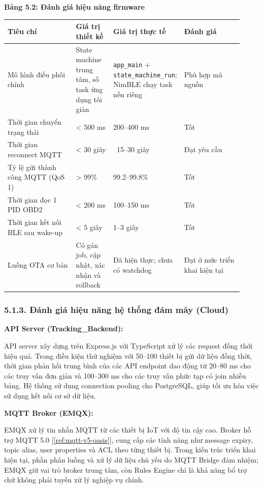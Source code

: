 \documentclass[13pt,a4paper]{extarticle}
\newcounter{none} %
\newcommand{\thesislongtableorignewline}{}
\let\thesislongtableorignewline\\
\renewcommand{\\}{\thesislongtableorignewline\hline}%
\let\\\thesislongtableorignewline
\newcommand{\thesistabletitle}[1]{%
  \begin{center}\textbf{#1}\end{center}%
}
\newcommand{\ieeecite}[1]{[\ref{#1}]}
\providecommand{\parencite}[1]{\ieeecite{#1}}
\begin{document}
\thesistabletitle{Bảng 5.2: Đánh giá hiệu năng firmware}

{\def\LTcaptype{none} %
\begin{longtable}{|p{0.30\linewidth}|p{0.16\linewidth}|p{0.20\linewidth}|p{0.26\linewidth}|}
\hline \textbf{Tiêu chí} & \textbf{Giá trị thiết kế} & \textbf{Giá trị thực tế} & \textbf{Đánh giá} \\
\hline
\endhead
\hline
\endlastfoot
Mô hình điều phối chính & State machine trung tâm, số task ứng dụng tối
giản & \texttt{app\_main} + \texttt{state\_machine\_run}; NimBLE chạy
task nền riêng & Phù hợp mã nguồn \\
Thời gian chuyển trạng thái & \textless{} 500 ms & 200--400 ms & Tốt \\
Thời gian reconnect MQTT & \textless{} 30 giây & ~15--30
giây & Đạt yêu cầu \\
Tỷ lệ gửi thành công MQTT (QoS 1) & \textgreater{} 99\% & 99.2--99.8\% &
Tốt \\
Thời gian đọc 1 PID OBD2 & \textless{} 200 ms & 100--150 ms & Tốt \\
Thời gian kết nối BLE sau wake-up & \textless{} 5 giây & 1--3 giây &
Tốt \\
Luồng OTA cơ bản & Có gán job, cập nhật, xác nhận và rollback & Đã hiện
thực; chưa có watchdog & Đạt ở mức triển khai hiện tại \\
\end{longtable}
}

\subsubsection{5.1.3. Đánh giá hiệu năng hệ thống đám mây
(Cloud)}\label{513-ux111uxe1nh-giuxe1-hiux1ec7u-nux103ng-hux1ec7-thux1ed1ng-ux111uxe1m-muxe2y-cloud}

\textbf{API Server (Tracking\_Backend):}

API server xây dựng trên Express.js với TypeScript xử lý các request
đồng thời hiệu quả. Trong điều kiện thử nghiệm với 50--100 thiết bị gửi
dữ liệu đồng thời, thời gian phản hồi trung bình của các API endpoint
dao động từ 20--80 ms cho các truy vấn đơn giản và 100--300 ms cho các
truy vấn phức tạp có join nhiều bảng. Hệ thống sử dụng connection
pooling cho PostgreSQL, giúp tối ưu hóa việc sử dụng kết nối cơ sở dữ
liệu.

\textbf{MQTT Broker (EMQX):}

EMQX xử lý tin nhắn MQTT từ các thiết bị IoT với độ tin cậy cao. Broker
hỗ trợ MQTT 5.0 \parencite{ref:mqtt-v5-oasis}, cung cấp các tính năng như message expiry, topic alias,
user properties và ACL theo từng thiết bị. Trong kiến trúc triển khai
hiện tại, phần phân luồng và xử lý dữ liệu chủ yếu do MQTT Bridge đảm
nhiệm; EMQX giữ vai trò broker trung tâm, còn Rules Engine chỉ là khả
năng bổ trợ chứ không phải tuyến xử lý nghiệp vụ chính.
\end{document}
